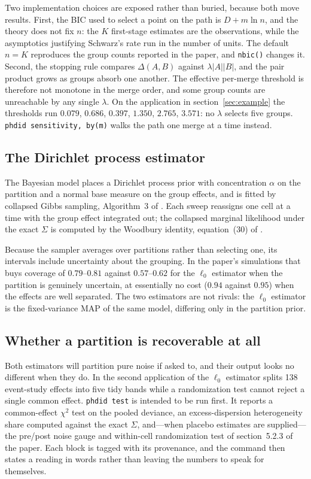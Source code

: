 \documentclass{sj}
\begin{document}
Two implementation choices are exposed rather than buried, because both move
results.  First, the BIC used to select a point on the path is $D + m\ln n$,
and the theory does not fix $n$: the $K$ first-stage estimates are the
observations, while the asymptotics justifying Schwarz's rate run in the
number of units.  The default $n = K$ reproduces the group counts reported in
the paper, and \texttt{nbic()} changes it.  Second, the stopping rule compares
$\Delta(A,B)$ against $\lambda|A||B|$, and the pair product grows as groups
absorb one another.  The effective per-merge threshold is therefore not
monotone in the merge order, and some group counts are unreachable by any
single $\lambda$.  On the application in section~\ref{sec:example} the
thresholds run $0.079$, $0.686$, $0.397$, $1.350$, $2.765$, $3.571$: no
$\lambda$ selects five groups.  \texttt{phdid sensitivity, by(m)} walks the
path one merge at a time instead.

\subsection{The Dirichlet process estimator}

The Bayesian model places a Dirichlet process prior with concentration
$\alpha$ on the partition and a normal base measure on the group effects, and
is fitted by collapsed Gibbs sampling, Algorithm~3 of \citet{Neal2000}.  Each
sweep reassigns one cell at a time with the group effect integrated out; the
collapsed marginal likelihood under the exact $\Sigma$ is computed by the
Woodbury identity, equation~(30) of \citet{AroraWagle2026}.

Because the sampler averages over partitions rather than selecting one, its
intervals include uncertainty about the grouping.  In the paper's simulations
that buys coverage of $0.79$--$0.81$ against $0.57$--$0.62$ for the $\ell_0$
estimator when the partition is genuinely uncertain, at essentially no cost
($0.94$ against $0.95$) when the effects are well separated.  The two
estimators are not rivals: the $\ell_0$ estimator is the fixed-variance MAP of
the same model, differing only in the partition prior.

\subsection{Whether a partition is recoverable at all}

Both estimators will partition pure noise if asked to, and their output looks
no different when they do.  In the second application of
\citet{AroraWagle2026} the $\ell_0$ estimator splits 138 event-study effects
into five tidy bands while a randomization test cannot reject a single common
effect.  \texttt{phdid test} is intended to be run first.  It reports a
common-effect $\chi^2$ test on the pooled deviance, an excess-dispersion
heterogeneity share computed against the exact $\Sigma$, and---when placebo
estimates are supplied---the pre/post noise gauge and within-cell
randomization test of section~5.2.3 of the paper.  Each block is tagged with
its provenance, and the command then states a reading in words rather than
leaving the numbers to speak for themselves.
\end{document}
